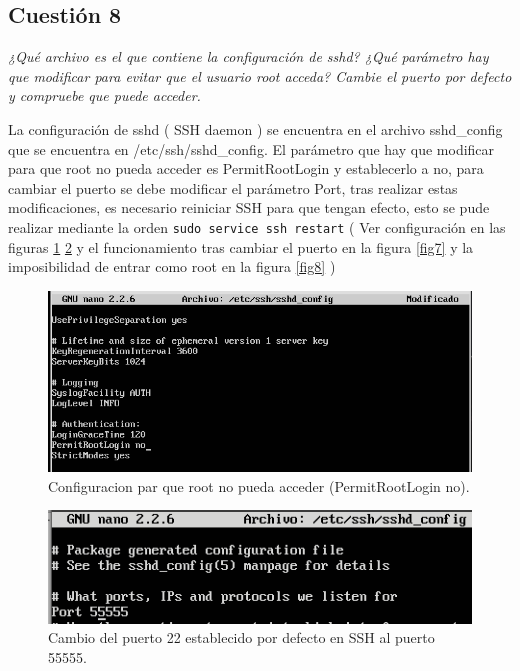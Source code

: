 \subsection{Cuestión 8}
\textit{¿Qué archivo es el que contiene la configuración de sshd? ¿Qué parámetro hay que modificar para evitar que el usuario root acceda? Cambie el puerto por defecto y compruebe que puede acceder.}
\newline

La configuración de sshd ( SSH daemon ) se encuentra en el archivo sshd\_config que se encuentra en /etc/ssh/sshd\_config. El parámetro que hay que modificar para que root no pueda acceder es PermitRootLogin y establecerlo a no, para cambiar el puerto se debe modificar el parámetro Port, tras realizar estas modificaciones, es necesario reiniciar SSH para que tengan efecto, esto se pude realizar mediante la orden \texttt{sudo service ssh restart} ( Ver configuración en las figuras \ref{fig5} \ref{fig6} y el funcionamiento tras cambiar el puerto en la figura \ref{fig7} y la imposibilidad de entrar como root en la figura \ref{fig8} ) \cite{sshd}

\begin{figure}[H]
    \begin{center}
        \includegraphics[scale=0.6]{imagenes/img5}
        \caption{Configuracion par que root no pueda acceder (PermitRootLogin no).}
        \label{fig5}
    \end{center}
\end{figure}

\begin{figure}[H]
    \begin{center}
        \includegraphics[scale=0.7]{imagenes/img7}
        \caption{Cambio del puerto 22 establecido por defecto en SSH al puerto 55555.}
        \label{fig6}
    \end{center}
\end{figure}

